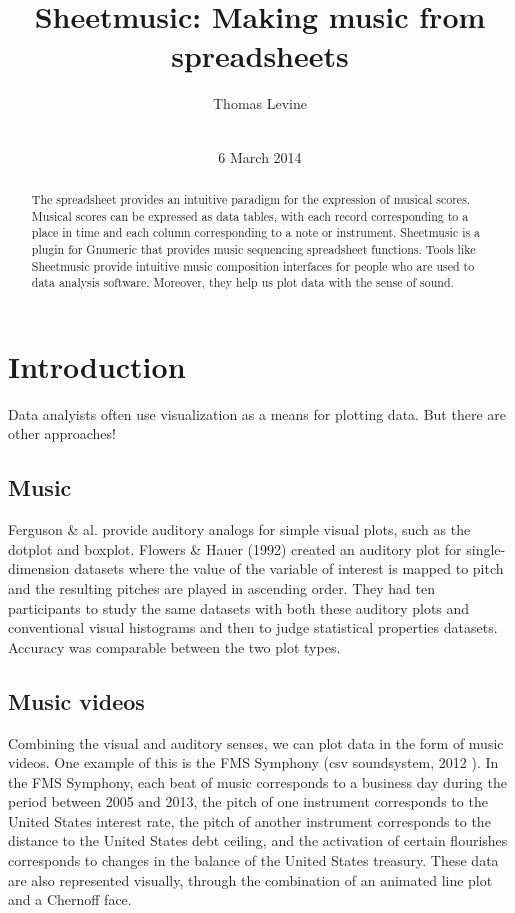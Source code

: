 \documentclass{acm_proc_article-sp}
\begin{document}
\title{Sheetmusic: Making music from spreadsheets}
\author{
\alignauthor
Thomas Levine\\
       \\
}
\date{6 March 2014}
\maketitle
\begin{abstract}
The spreadsheet provides an intuitive paradigm for the expression of musical
scores. Musical scores can be expressed as data tables, with each record
corresponding to a place in time and each column corresponding to a note
or instrument. Sheetmusic is a plugin for Gnumeric that provides music
sequencing spreadsheet functions. Tools like Sheetmusic provide intuitive
music composition interfaces for people who are used to data analysis software.
Moreover, they help us plot data with the sense of sound.
\end{abstract}
\section{Introduction}
Data analyists often use visualization as a means for plotting data.
But there are other approaches!

\subsection{Music}
Ferguson \& al. \cite{ferguson} provide auditory analogs for simple
visual plots, such as the dotplot and boxplot.
Flowers \& Hauer (1992) \cite{flowers1992} created an auditory plot for
single-dimension datasets where the value of the variable of interest
is mapped to pitch and the resulting pitches are played in ascending
order. They had ten participants to study the same datasets with both
these auditory plots and conventional visual histograms and then to
judge statistical properties datasets. Accuracy was comparable between
the two plot types.

\subsection{Music videos}
Combining the visual and auditory senses, we can plot data in the form
of music videos. One example of this is the FMS Symphony
(csv soundsystem, 2012 \cite{fms}).
In the FMS Symphony, each beat of music corresponds to a business day
during the period between 2005 and 2013, the pitch of one instrument
corresponds to the United States interest rate, the pitch of another
instrument corresponds to the distance to the United States debt ceiling,
and the activation of certain flourishes corresponds to changes in the
balance of the United States treasury. These data are also represented
visually, through the combination of an animated line plot and a
Chernoff face.
\cite{fms-about}
\end{document}
